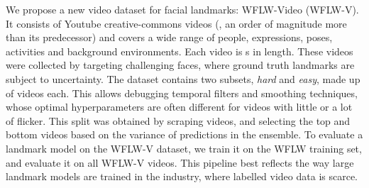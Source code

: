 \documentclass[10pt,twocolumn,letterpaper]{article}
\begin{document}
We propose a new video dataset for facial landmarks: WFLW-Video (WFLW-V). It consists of  Youtube creative-commons videos (\ie, an order of magnitude more than its predecessor) and covers a wide range of people, expressions, poses, activities and background environments. Each video is s in length. These videos were collected by targeting challenging faces, where ground truth landmarks are subject to uncertainty. The dataset contains two subsets, \textit{hard} and \textit{easy}, made up of  videos each. This allows debugging temporal filters and smoothing techniques, whose optimal hyperparameters are often different for videos with little or a lot of flicker. This split was obtained by scraping  videos, and selecting the top and bottom  videos based on the variance of predictions in the ensemble. To evaluate a landmark model on the WFLW-V dataset, we train it on the WFLW training set, and evaluate it on all WFLW-V videos. This pipeline best reflects the way large landmark models are trained in the industry, where labelled video data is scarce.
\end{document}
